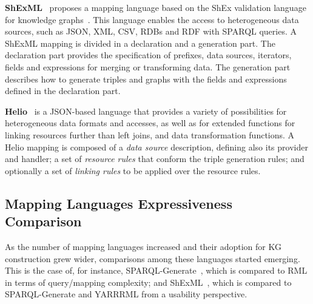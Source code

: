\noindent\textbf{ShExML}~\parencite{Garcia-Gonzalez2020shexml,shexml} proposes a mapping language based on the ShEx validation language for knowledge graphs~\parencite{prud2014shex}. This language enables the access to heterogeneous data sources, such as JSON, XML, CSV, RDBs and RDF with SPARQL queries. A ShExML mapping is divided in a declaration and a generation part. The declaration part provides the specification of prefixes, data sources, iterators, fields and expressions for merging or transforming data. The generation part describes how to generate triples and graphs with the fields and expressions defined in the declaration part. 

\noindent\textbf{Helio}~\parencite{cimmino2022helio} is a JSON-based language that provides a variety of possibilities for heterogeneous data formats and accesses, as well as for extended functions for linking resources further than left joins, and data transformation functions. A Helio mapping is composed of a \textit{data source} description, defining also its provider and handler; a set of \textit{resource rules} that conform the triple generation rules; and optionally a set of \textit{linking rules} to be applied over the resource rules. 








\subsection{Mapping Languages Expressiveness Comparison}
\label{sec:chp2_language-comparison}

As the number of mapping languages increased and their adoption for KG construction grew wider, comparisons among these languages started emerging. This is the case of, for instance, SPARQL-Generate~\parencite{Lefrancois2017sparqlgenerate}, which is compared to RML in terms of query/mapping complexity; and ShExML~\parencite{Garcia-Gonzalez2020shexml}, which is compared to SPARQL-Generate and YARRRML from a usability perspective.

